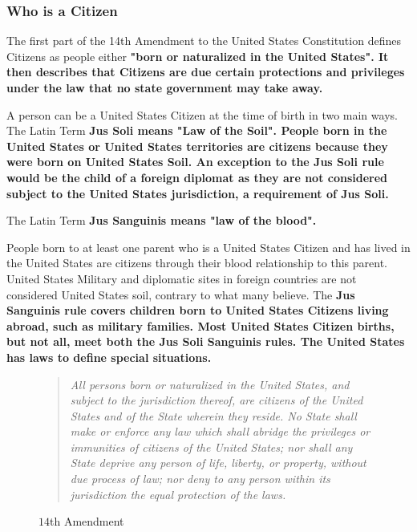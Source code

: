 
\subsubsection*{Who is a Citizen}

The first part of the 14th Amendment to the United States Constitution defines
Citizens as people either \bf{"born or naturalized in the United States"}.
It then describes that Citizens are due certain protections and privileges
under the law that no state government may take away.

A person can be a United States Citizen at the time of birth in two main ways.
The Latin Term \bf{Jus Soli} means \bf{"Law of the Soil"}. People born
in the United States or United States territories are citizens because they
were born on United States Soil. An exception to the \bf{Jus Soli} rule
would be the child of a foreign diplomat as they are not considered subject to
the United States jurisdiction, a requirement of \bf{Jus Soli}.

The Latin Term \bf{Jus Sanguinis} means \bf{"law of the blood"}.

People born to at least one parent who is a United States Citizen and has lived
in the United States are citizens through their blood relationship to this
parent. United States Military and diplomatic sites in foreign countries are
not considered United States soil, contrary to what many believe. The
\bf{Jus Sanguinis} rule covers children born to United States Citizens
living abroad, such as military families. Most United States Citizen births,
but not all, meet both the \bf{Jus Soli Sanguinis} rules. The United States
has laws to define special situations.

\begin{figure}[h]
    \begin{quote}
        \it{All persons born or naturalized in the United States, and subject to
        the jurisdiction thereof, are citizens of the United States and of the State
        wherein they reside. No State shall make or enforce any law which shall abridge
        the privileges or immunities of citizens of the United States; nor shall any
        State deprive any person of life, liberty, or property, without due process of
        law; nor deny to any person within its jurisdiction the equal protection of the
        laws.}
    \end{quote}
    \caption{$14$th Amendment}
\end{figure}



